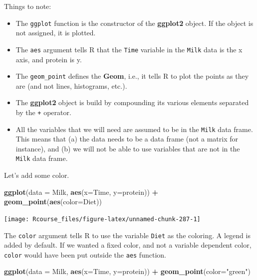 \documentclass[]{book}
\newenvironment{Shaded}{\begin{snugshade}}{\end{snugshade}}
\newcommand{\DataTypeTok}[1]{\textcolor[rgb]{0.13,0.29,0.53}{#1}}
\newcommand{\KeywordTok}[1]{\textcolor[rgb]{0.13,0.29,0.53}{\textbf{#1}}}
\newcommand{\NormalTok}[1]{#1}
\newcommand{\OperatorTok}[1]{\textcolor[rgb]{0.81,0.36,0.00}{\textbf{#1}}}
\newcommand{\StringTok}[1]{\textcolor[rgb]{0.31,0.60,0.02}{#1}}
\providecommand{\tightlist}{%
  \setlength{\itemsep}{0pt}\setlength{\parskip}{0pt}}
\theoremstyle{definition}
\theoremstyle{definition}
\theoremstyle{definition}
\theoremstyle{remark}
\begin{document}
Things to note:

\begin{itemize}
\tightlist
\item
  The \texttt{ggplot} function is the constructor of the \textbf{ggplot2} object. If the object is not assigned, it is plotted.
\item
  The \texttt{aes} argument tells R that the \texttt{Time} variable in the \texttt{Milk} data is the x axis, and protein is y.
\item
  The \texttt{geom\_point} defines the \textbf{Geom}, i.e., it tells R to plot the points as they are (and not lines, histograms, etc.).
\item
  The \textbf{ggplot2} object is build by compounding its various elements separated by the \texttt{+} operator.
\item
  All the variables that we will need are assumed to be in the \texttt{Milk} data frame. This means that (a) the data needs to be a data frame (not a matrix for instance), and (b) we will not be able to use variables that are not in the \texttt{Milk} data frame.
\end{itemize}

Let's add some color.

\begin{Shaded}
\begin{Highlighting}[]
\KeywordTok{ggplot}\NormalTok{(}\DataTypeTok{data =}\NormalTok{ Milk, }\KeywordTok{aes}\NormalTok{(}\DataTypeTok{x=}\NormalTok{Time, }\DataTypeTok{y=}\NormalTok{protein)) }\OperatorTok{+}
\StringTok{  }\KeywordTok{geom_point}\NormalTok{(}\KeywordTok{aes}\NormalTok{(}\DataTypeTok{color=}\NormalTok{Diet))}
\end{Highlighting}
\end{Shaded}

\texttt{[image: Rcourse\_files/figure-latex/unnamed-chunk-287-1]}

The \texttt{color} argument tells R to use the variable \texttt{Diet} as the coloring.
A legend is added by default.
If we wanted a fixed color, and not a variable dependent color, \texttt{color} would have been put outside the \texttt{aes} function.

\begin{Shaded}
\begin{Highlighting}[]
\KeywordTok{ggplot}\NormalTok{(}\DataTypeTok{data =}\NormalTok{ Milk, }\KeywordTok{aes}\NormalTok{(}\DataTypeTok{x=}\NormalTok{Time, }\DataTypeTok{y=}\NormalTok{protein)) }\OperatorTok{+}
\StringTok{  }\KeywordTok{geom_point}\NormalTok{(}\DataTypeTok{color=}\StringTok{"green"}\NormalTok{)}
\end{Highlighting}
\end{Shaded}
\end{document}
